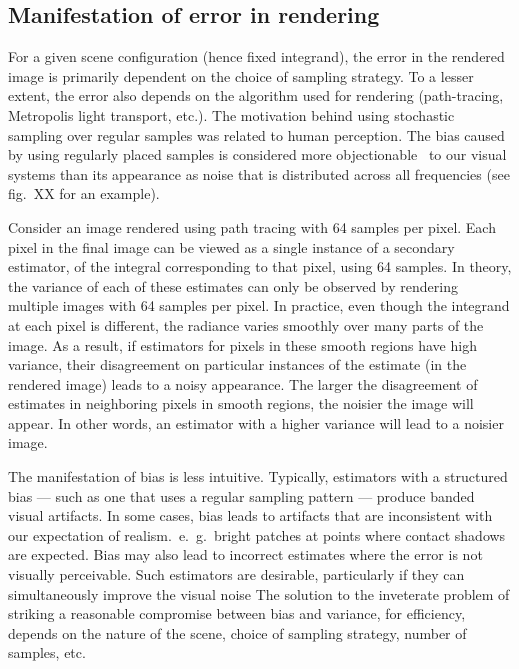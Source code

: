 %
%
%
\subsection{Manifestation of error in rendering}
For a given scene configuration (hence fixed integrand), the error in the rendered image is primarily dependent on the choice of sampling strategy. To a lesser extent, the error also depends on the algorithm used for rendering (path-tracing, Metropolis light transport, etc.). The motivation behind using stochastic sampling over regular samples was related to human perception. The bias caused by using regularly placed samples is considered more objectionable~\cite{} to our visual systems than its appearance as noise that is distributed across all frequencies (see fig.~XX for an example). 

Consider an image rendered using path tracing with 64 samples per pixel. Each pixel in the final image can be viewed as a single instance of a secondary estimator, of the integral corresponding to that pixel, using 64 samples. In theory, the variance of each of these estimates can only be observed by rendering multiple images with 64 samples per pixel. In practice, even though the integrand at each pixel is different, the radiance varies smoothly over many parts of the image. As a result, if estimators for pixels in these smooth regions have high variance, their disagreement on particular instances of the estimate (in the rendered image) leads to a noisy appearance. The larger the disagreement of estimates in neighboring pixels in smooth regions, the noisier the image will appear. In other words, an estimator with a higher variance will lead to a noisier image.

The manifestation of bias is less intuitive. Typically, estimators with a structured bias --- such as one that uses a regular sampling pattern --- produce banded visual artifacts. In some cases, bias leads to artifacts that are inconsistent with our expectation of realism.~e.~g.~bright patches at points where contact shadows are expected. Bias may also lead to incorrect estimates where the error is not visually perceivable. Such estimators are desirable, particularly if they can simultaneously improve the visual noise The solution to the inveterate problem of striking a reasonable compromise between bias and variance, for efficiency, depends on the nature of the scene, choice of sampling strategy, number of samples, etc. 

